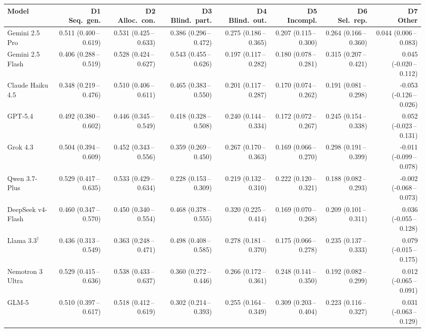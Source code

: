\begin{tabular}{lrrrrrrr}
\toprule
Model & \makecell{D1\\Seq.\ gen.} & \makecell{D2\\Alloc.\ con.} & \makecell{D3\\Blind.\ part.} & \makecell{D4\\Blind.\ out.} & \makecell{D5\\Incompl.} & \makecell{D6\\Sel.\ rep.} & \makecell{D7\\Other} \\
\midrule
Gemini 2.5 Pro & 0.511 (0.400\,--\,0.619) & 0.531 (0.425\,--\,0.633) & 0.386 (0.296\,--\,0.472) & 0.275 (0.186\,--\,0.365) & 0.207 (0.115\,--\,0.300) & 0.264 (0.166\,--\,0.360) & 0.044 (0.006\,--\,0.083) \\
Gemini 2.5 Flash & 0.406 (0.288\,--\,0.519) & 0.528 (0.424\,--\,0.627) & 0.543 (0.455\,--\,0.626) & 0.197 (0.117\,--\,0.282) & 0.180 (0.078\,--\,0.281) & 0.315 (0.207\,--\,0.421) & 0.045 (-0.020\,--\,0.112) \\
Claude Haiku 4.5 & 0.348 (0.219\,--\,0.476) & 0.510 (0.406\,--\,0.611) & 0.465 (0.383\,--\,0.550) & 0.201 (0.117\,--\,0.287) & 0.170 (0.074\,--\,0.262) & 0.191 (0.081\,--\,0.298) & -0.053 (-0.126\,--\,0.026) \\
GPT-5.4 & 0.492 (0.380\,--\,0.602) & 0.446 (0.345\,--\,0.549) & 0.418 (0.328\,--\,0.508) & 0.240 (0.144\,--\,0.334) & 0.172 (0.072\,--\,0.267) & 0.245 (0.154\,--\,0.338) & 0.052 (-0.023\,--\,0.131) \\
Grok 4.3 & 0.504 (0.394\,--\,0.609) & 0.452 (0.343\,--\,0.556) & 0.359 (0.269\,--\,0.450) & 0.267 (0.170\,--\,0.363) & 0.169 (0.066\,--\,0.270) & 0.298 (0.191\,--\,0.399) & -0.011 (-0.099\,--\,0.078) \\
Qwen 3.7-Plus & 0.529 (0.417\,--\,0.635) & 0.533 (0.429\,--\,0.634) & 0.228 (0.153\,--\,0.309) & 0.219 (0.132\,--\,0.310) & 0.222 (0.120\,--\,0.321) & 0.188 (0.082\,--\,0.293) & -0.002 (-0.068\,--\,0.073) \\
DeepSeek v4-Flash & 0.460 (0.347\,--\,0.570) & 0.450 (0.340\,--\,0.554) & 0.468 (0.378\,--\,0.555) & 0.320 (0.225\,--\,0.414) & 0.169 (0.070\,--\,0.268) & 0.209 (0.101\,--\,0.311) & 0.036 (-0.055\,--\,0.128) \\
Llama 3.3$^\dagger$ & 0.436 (0.313\,--\,0.549) & 0.363 (0.248\,--\,0.471) & 0.498 (0.408\,--\,0.585) & 0.278 (0.181\,--\,0.370) & 0.175 (0.066\,--\,0.278) & 0.235 (0.137\,--\,0.333) & 0.079 (-0.015\,--\,0.175) \\
Nemotron 3 Ultra & 0.529 (0.415\,--\,0.636) & 0.538 (0.433\,--\,0.637) & 0.360 (0.272\,--\,0.446) & 0.266 (0.172\,--\,0.361) & 0.248 (0.141\,--\,0.350) & 0.192 (0.082\,--\,0.299) & 0.012 (-0.065\,--\,0.091) \\
GLM-5 & 0.510 (0.397\,--\,0.617) & 0.518 (0.412\,--\,0.619) & 0.302 (0.214\,--\,0.393) & 0.255 (0.164\,--\,0.349) & 0.309 (0.203\,--\,0.404) & 0.223 (0.116\,--\,0.327) & 0.031 (-0.063\,--\,0.129) \\
\bottomrule
\end{tabular}
